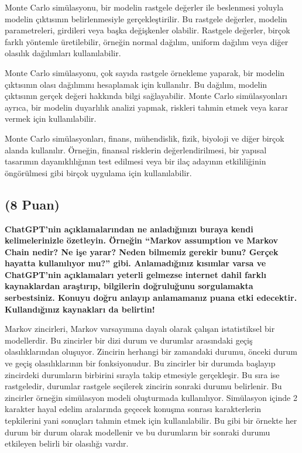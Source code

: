 \documentclass[11pt]{article}
\begin{document}
Monte Carlo simülasyonu, bir modelin rastgele değerler ile beslenmesi yoluyla modelin çıktısının belirlenmesiyle gerçekleştirilir. Bu rastgele değerler, modelin parametreleri, girdileri veya başka değişkenler olabilir. Rastgele değerler, birçok farklı yöntemle üretilebilir, örneğin normal dağılım, uniform dağılım veya diğer olasılık dağılımları kullanılabilir.

Monte Carlo simülasyonu, çok sayıda rastgele örnekleme yaparak, bir modelin çıktısının olası dağılımını hesaplamak için kullanılır. Bu dağılım, modelin çıktısının gerçek değeri hakkında bilgi sağlayabilir. Monte Carlo simülasyonları ayrıca, bir modelin duyarlılık analizi yapmak, riskleri tahmin etmek veya karar vermek için kullanılabilir.

Monte Carlo simülasyonları, finans, mühendislik, fizik, biyoloji ve diğer birçok alanda kullanılır. Örneğin, finansal risklerin değerlendirilmesi, bir yapısal tasarımın dayanıklılığının test edilmesi veya bir ilaç adayının etkililiğinin öngörülmesi gibi birçok uygulama için kullanılabilir.


\subsection{(8 Puan)} \textbf{ChatGPT’nin açıklamalarından ne anladığınızı buraya kendi kelimelerinizle özetleyin. Örneğin ``Markov assumption ve Markov Chain nedir? Ne işe yarar? Neden bilmemiz gerekir bunu? Gerçek hayatta kullanılıyor mu?'' gibi. Anlamadığınız kısımlar varsa ve ChatGPT’nin açıklamaları yeterli gelmezse internet dahil farklı kaynaklardan araştırıp, bilgilerin doğruluğunu sorgulamakta serbestsiniz. Konuyu doğru anlayıp anlamamanız puana etki edecektir. Kullandığınız kaynakları da belirtin!}

Markov zincirleri, Markov varsayımına dayalı olarak çalışan istatistiksel bir modellerdir. Bu zincirler bir dizi durum ve durumlar arasındaki geçiş olasılıklarından oluşuyor. Zincirin herhangi bir zamandaki durumu, önceki durum ve geçiş olasılıklarının bir fonksiyonudur. Bu zincirler bir durumda başlayıp zincirdeki durumların birbirini sırayla takip etmesiyle gerçekleşir. Bu sıra ise rastgeledir, durumlar rastgele seçilerek zincirin sonraki durumu belirlenir. Bu zincirler örneğin simülasyon modeli oluşturmada kullanılıyor. Simülasyon içinde 2 karakter hayal edelim aralarında geçecek konuşma sonrası karakterlerin tepkilerini yani sonuçları tahmin etmek için kullanılabilir. Bu gibi bir örnekte her durum bir durum olarak modellenir ve bu durumların bir sonraki durumu etkileyen belirli bir olasılığı vardır. 
\end{document}

